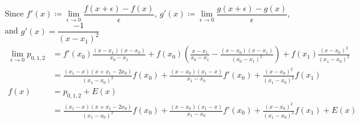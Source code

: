 \documentclass[12pt]{article}
\begin{document}
Since $f'(x) \coloneqq \lim\limits_{\epsilon\rightarrow 0}\dfrac{f(x + \epsilon) - f(x)}{\epsilon}$, $g'(x) \coloneqq \lim\limits_{\epsilon\rightarrow 0}\dfrac{g(x + \epsilon) - g(x)}{\epsilon}$, and $g'(x) = \dfrac{-1}{(x - x_1)^2}$
\begin{align*}
\lim\limits_{\epsilon\rightarrow 0}p_{0, 1, 2} &= f'(x_0)\frac{(x - x_1)(x - x_0)}{x_0 - x_1} + f(x_0)\left(\frac{x - x_1}{x_0 - x_1} - \frac{(x - x_0)(x - x_1)}{(x_0 - x_1)^2}\right) + f(x_1)\frac{(x - x_0)^2}{(x_1 - x_0)^2} \\[.1cm]
&= \frac{(x_1 - x)(x + x_1 - 2x_0)}{(x_1 - x_0)^2}f(x_0) + \frac{(x - x_0)(x_1 - x)}{x_1 - x_0}f'(x_0) + \frac{(x - x_0)^2}{(x_1 - x_0)^2}f(x_1) \\[.1cm]
f(x) &= p_{0, 1, 2} + E(x)\\[.1cm]
&= \frac{(x_1 - x)(x + x_1 - 2x_0)}{(x_1 - x_0)^2}f(x_0) + \frac{(x - x_0)(x_1 - x)}{x_1 - x_0}f'(x_0) + \frac{(x - x_0)^2}{(x_1 - x_0)^2}f(x_1) + E(x)
\end{align*}

%
%
%
%
%
%
\end{document}
